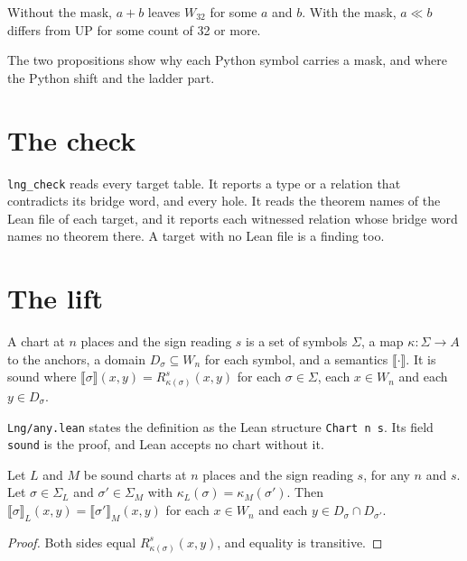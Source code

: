 \begin{proposition}
Without the mask, $a + b$ leaves $W_{32}$ for some $a$ and $b$. With the mask, $a \ll b$ differs from UP for some
count of 32 or more.
\end{proposition}

The two propositions show why each Python symbol carries a mask, and where the Python shift and the ladder part.

\section{The check}

\texttt{lng\_check} reads every target table. It reports a type or a relation that contradicts its bridge word,
and every hole. It reads the theorem names of the Lean file of each target, and it reports each witnessed relation
whose bridge word names no theorem there. A target with no Lean file is a finding too.

\section{The lift}

\begin{definition}
A chart at $n$ places and the sign reading $s$ is a set of symbols $\Sigma$, a map $\kappa : \Sigma \to A$ to the
anchors, a domain $D_\sigma \subseteq W_n$ for each symbol, and a semantics $\lBrack\cdot\rBrack$. It is sound where
$\lBrack\sigma\rBrack(x, y) = R^{s}_{\kappa(\sigma)}(x, y)$ for each $\sigma \in \Sigma$, each $x \in W_n$ and
each $y \in D_\sigma$.
\end{definition}

\texttt{Lng/any.lean} states the definition as the Lean structure \texttt{Chart n s}. Its field \texttt{sound} is
the proof, and Lean accepts no chart without it.

\begin{theorem}
Let $L$ and $M$ be sound charts at $n$ places and the sign reading $s$, for any $n$ and $s$. Let
$\sigma \in \Sigma_L$ and $\sigma' \in \Sigma_M$ with $\kappa_L(\sigma) = \kappa_M(\sigma')$. Then
$\lBrack\sigma\rBrack_L(x, y) = \lBrack\sigma'\rBrack_M(x, y)$ for each $x \in W_n$ and each
$y \in D_\sigma \cap D_{\sigma'}$.
\end{theorem}

\begin{proof}
Both sides equal $R^{s}_{\kappa(\sigma)}(x, y)$, and equality is transitive.
\end{proof}

